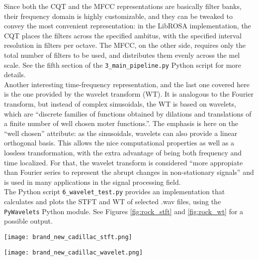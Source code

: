   Since both the CQT and the MFCC representations are basically filter banks, their frequency domain is highly customizable, and they can be tweaked to convey the most convenient representation: in the LibROSA implementation, the CQT places the filters across the specified ambitus, with the specified interval resolution in filters per octave. The MFCC, on the other side, requires only the total number of filters to be used, and distributes them evenly across the mel scale. See the fifth section of the \texttt{3\_main\_pipeline.py} Python script for more details.\\

  Another interesting time-frequency representation, and the last one covered here is the one provided by the wavelet transform (WT). It is analogous to the Fourier transform, but instead of complex sinusoidals, the WT is based on wavelets, which are ``discrete families of functions obtained by dilations and translations of a finite number of well chosen moter functions.''\cite[1]{wavelets}. The emphasis is here on the ``well chosen'' attribute: as the sinusoidals, wavelets can also provide a linear orthogonal basis. This allows the nice computational properties as well as a lossless transformation, with the extra advantage of being both frequency and time localized. For that, the wavelet transform is considered ``more appropiate than Fourier series to represent the abrupt changes in non-stationary signals''\cite[1]{wavelets} and is used in many applications in the signal processing field.\\

  The Python script \texttt{6\_wavelet\_test.py} provides an implementation that calculates and plots the STFT and WT of selected .wav files, using the \texttt{PyWavelets} Python module\cite{pywt}. See Figures \ref{fig:rock_stft} and \ref{fig:rock_wt} for a possible output.



  \begin{sidewaysfigure}
    \centering
    \texttt{[image: brand\_new\_cadillac\_stft.png]}
    \caption{The STFT of a rock song, for a window size of 512, and an overlapping factor of 50\%.}
    \label{fig:rock_stft}
    \vspace{1.6cm}
    \texttt{[image: brand\_new\_cadillac\_wavelet.png]}
    \vspace{-0.5cm}
    \caption{The wavelet transform of the same song, computed for the simplest Daubechies wavelet.}
    \label{fig:rock_wt}
  \end{sidewaysfigure}


